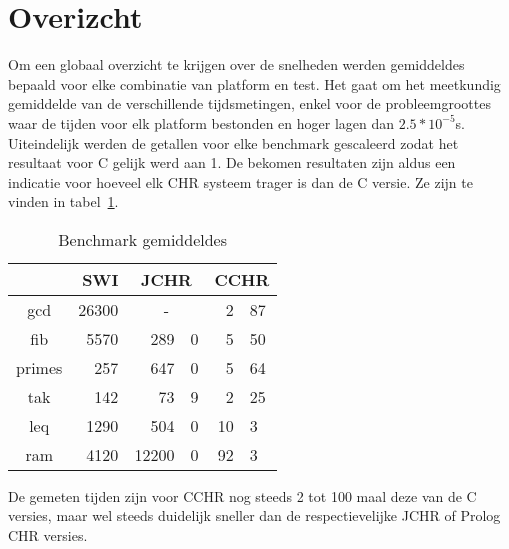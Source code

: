 \section{Overizcht} \label{sec:bench-end}

Om een globaal overzicht te krijgen over de snelheden werden gemiddeldes bepaald voor elke combinatie van platform en test. Het gaat om het meetkundig gemiddelde van de verschillende tijdsmetingen, enkel voor de probleemgroottes waar de tijden voor elk platform bestonden en hoger lagen dan $2.5 * 10^{-5}$s. Uiteindelijk werden de getallen voor elke benchmark gescaleerd zodat het resultaat voor C gelijk werd aan 1. De bekomen resultaten zijn aldus een indicatie voor hoeveel elk CHR systeem trager is dan de C versie. Ze zijn te vinden in tabel~\ref{tbl:benches}.
\begin{table}
\begin{center}
\begin{tabular}{c|rr@{.}lr@{.}l}
 & {\bf SWI} & \multicolumn{2}{c}{\bf JCHR} & \multicolumn{2}{c}{\bf CCHR} \\
\hline
gcd    & 26300 & \multicolumn{2}{c}{-} &   2&87 \\
fib    & 5570  &   289&0               &   5&50 \\
primes & 257   &   647&0               &   5&64 \\
tak    & 142   &    73&9               &   2&25 \\
leq    & 1290  &   504&0               &  10&3 \\
ram    & 4120  & 12200&0               &  92&3 \\
\end{tabular}
\caption{Benchmark gemiddeldes}
\label{tbl:benches}
\end{center}
\end{table}
De gemeten tijden zijn voor CCHR nog steeds 2 tot 100 maal deze van de C versies, maar wel steeds duidelijk sneller dan de respectievelijke JCHR of Prolog CHR versies.